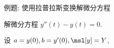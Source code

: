 \begin{frame}{例题: 使用拉普拉斯变换解微分方程}
	\onslide<+->
	\begin{example}
		解微分方程 $y''(t)-y(t)=0$.
	\end{example}

	\onslide<+->
	\begin{solution}
			设 $a=y(0),b=y'(0),\msl[y]=Y$,
		\onslide<+->{则
			\[\msl[y'']=s^2Y-as-b,
	\]
		}
		\bigdel
		\onslide<+->{
			\[s^2Y-as-b-Y=0,
	\]
		}\onslide<+->{
			\[Y(s)=\frac{as+b}{s^2-1}=\frac{a+b}2\cdot\frac1{s-1}+\frac{a-b}2\cdot\frac1{s+1},
	\]
		}\onslide<+->{
			\[y(t)=\msl^{-1}[Y(s)]=\frac{a+b}2\ee^t+\frac{a-b}2\ee^{-t}.
	\]
		}
		\vspace{-.5\baselineskip}
	\end{solution}
\end{frame}
